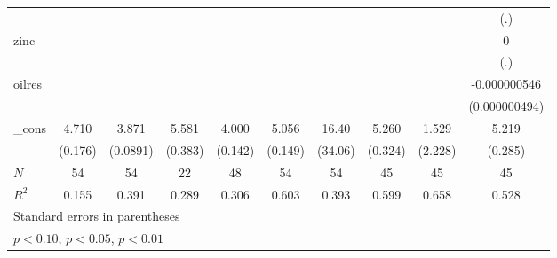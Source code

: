 {\begin{tabular}{l*{9}{c}}
            &                     &                     &                     &                     &                     &                     &                     &                     &         (.)         \\
[1em]
zinc        &                     &                     &                     &                     &                     &                     &                     &                     &           0         \\
            &                     &                     &                     &                     &                     &                     &                     &                     &         (.)         \\
[1em]
oilres      &                     &                     &                     &                     &                     &                     &                     &                     &-0.000000546         \\
            &                     &                     &                     &                     &                     &                     &                     &                     &(0.000000494)         \\
[1em]
\_cons      &       4.710\sym{***}&       3.871\sym{***}&       5.581\sym{***}&       4.000\sym{***}&       5.056\sym{***}&       16.40         &       5.260\sym{***}&       1.529         &       5.219\sym{***}\\
            &     (0.176)         &    (0.0891)         &     (0.383)         &     (0.142)         &     (0.149)         &     (34.06)         &     (0.324)         &     (2.228)         &     (0.285)         \\
\hline
\(N\)       &          54         &          54         &          22         &          48         &          54         &          54         &          45         &          45         &          45         \\
\(R^{2}\)   &       0.155         &       0.391         &       0.289         &       0.306         &       0.603         &       0.393         &       0.599         &       0.658         &       0.528         \\
\hline\hline
\multicolumn{10}{l}{\footnotesize Standard errors in parentheses}\\
\multicolumn{10}{l}{\footnotesize \sym{*} \(p<0.10\), \sym{**} \(p<0.05\), \sym{***} \(p<0.01\)}\\
\end{tabular}
}
